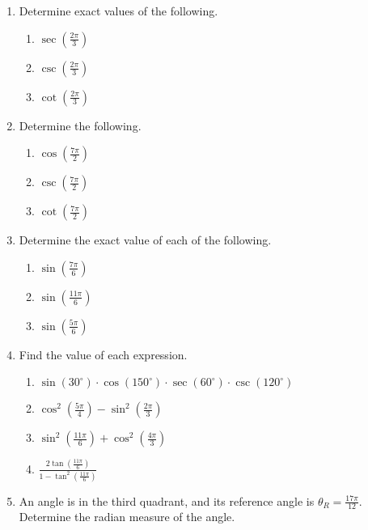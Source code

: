 \begin{enumerate}
\item  Determine exact values of the following.
  \begin{enumerate}
  \item $\sec\left(\frac{2\pi}{3}\right)$
  \item $\csc\left(\frac{2\pi}{3}\right)$
  \item $\cot\left(\frac{2\pi}{3}\right)$
  \end{enumerate}
\item Determine the following.
  \begin{enumerate}
  \item $\cos\left(\frac{7\pi}{2}\right)$
  \item $\csc\left(\frac{7\pi}{2}\right)$
  \item $\cot\left(\frac{7\pi}{2}\right)$
  \end{enumerate}
\item Determine the exact value of each of the following. %
  \begin{enumerate}
  \item $\sin\left(\frac{7\pi}{6}\right)$ 
  \item $\sin\left(\frac{11\pi}{6}\right)$
  \item $\sin\left(\frac{5\pi}{6}\right)$ 
  \end{enumerate}
\item Find the value of each expression.
  \begin{enumerate}
  \item $\sin\left(30^\circ\right)\cdot \cos\left(150^\circ\right)\cdot \sec\left(60^\circ\right)\cdot \csc\left(120^\circ\right)$
  \item $\cos^2\left(\frac{5\pi}{4}\right)-\sin^2\left(\frac{2\pi}{3}\right)$
  \item $\sin^2\left(\frac{11\pi}{6}\right)+\cos^2\left(\frac{4\pi}{3}\right)$
  \item $\displaystyle \frac{2\tan\left(\frac{11\pi}{6}\right)}{1-\tan^2\left(\frac{11\pi}{6}\right)}$
  \end{enumerate}
\item An angle is in the third quadrant, and its reference angle is
  $\theta_R=\frac{17\pi}{12}$. Determine the radian measure of the
  angle.


\end{enumerate}
